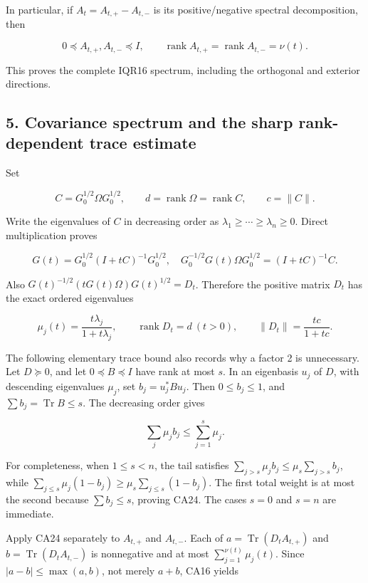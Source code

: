 \documentclass[11pt]{article}
\begin{document}
In particular, if \(A_t=A_{t,+}-A_{t,-}\) is its positive/negative spectral decomposition, then

\[
0\preceq A_{t,+},A_{t,-}\preceq I,
\qquad
\operatorname{rank}A_{t,+}=\operatorname{rank}A_{t,-}=\nu(t).
\tag{CA20}
\]

This proves the complete IQR16 spectrum, including the orthogonal and exterior directions.

\subsection{5. Covariance spectrum and the sharp rank-dependent trace estimate}\label{covariance-spectrum-and-the-sharp-rank-dependent-trace-estimate}

Set

\[
C=G_0^{1/2}\Omega G_0^{1/2},\qquad
d=\operatorname{rank}\Omega=\operatorname{rank}C,
\qquad c=\|C\|.
\tag{CA21}
\]

Write the eigenvalues of \(C\) in decreasing order as \(\lambda_1\ge\cdots\ge\lambda_n\ge0\). Direct multiplication proves

\[
G(t)=G_0^{1/2}(I+tC)^{-1}G_0^{1/2},
\quad
G_0^{-1/2}G(t)\Omega G_0^{1/2}=(I+tC)^{-1}C.
\tag{CA22}
\]

Also \(G(t)^{-1/2}(tG(t)\Omega)G(t)^{1/2}=D_t\). Therefore the positive matrix \(D_t\) has the exact ordered eigenvalues

\[
\mu_j(t)=\frac{t\lambda_j}{1+t\lambda_j},
\qquad
\operatorname{rank}D_t=d\ (t>0),
\qquad \|D_t\|=\frac{tc}{1+tc}.
\tag{CA23}
\]

The following elementary trace bound also records why a factor 2 is unnecessary. Let \(D\succeq0\), and let \(0\preceq B\preceq I\) have rank at most \(s\). In an eigenbasis \(u_j\) of \(D\), with descending eigenvalues \(\mu_j\), set \(b_j=u_j^*Bu_j\). Then \(0\le b_j\le1\), and \(\sum b_j=\operatorname{Tr}B\le s\). The decreasing order gives

\[
\sum_j\mu_jb_j\le\sum_{j=1}^s\mu_j.
\tag{CA24}
\]

For completeness, when \(1\le s<n\), the tail satisfies \(\sum_{j>s}\mu_jb_j\le\mu_s\sum_{j>s}b_j\), while \(\sum_{j\le s}\mu_j(1-b_j)\ge\mu_s\sum_{j\le s}(1-b_j)\). The first total weight is at most the second because \(\sum b_j\le s\), proving CA24. The cases \(s=0\) and \(s=n\) are immediate.

Apply CA24 separately to \(A_{t,+}\) and \(A_{t,-}\). Each of \(a=\operatorname{Tr}(D_tA_{t,+})\) and \(b=\operatorname{Tr}(D_tA_{t,-})\) is nonnegative and at most \(\sum_{j=1}^{\nu(t)}\mu_j(t)\). Since \(|a-b|\le\max(a,b)\), not merely \(a+b\), CA16 yields
\end{document}
